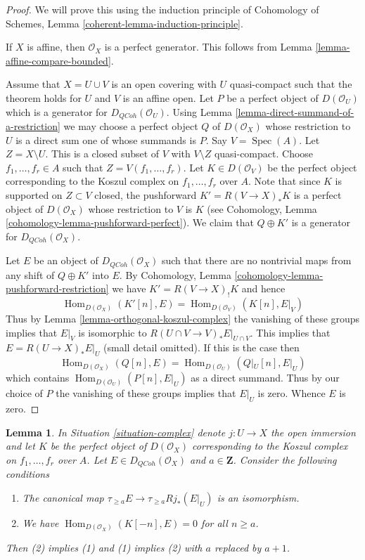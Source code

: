 \documentclass{amsart}
\theoremstyle{plain}
\newtheorem{lemma}[subsection]{Lemma}
\theoremstyle{definition}
\theoremstyle{remark}
\numberwithin{equation}{subsection}
\def\Spec{\mathop{\mathrm{Spec}}}
\def\Hom{\mathop{\mathrm{Hom}}\nolimits}
\def\QCoh{\mathit{QCoh}}
\begin{document}
\begin{proof}
We will prove this using the induction principle of
Cohomology of Schemes, Lemma \ref{coherent-lemma-induction-principle}.

\medskip\noindent
If $X$ is affine, then $\mathcal{O}_X$ is a perfect generator.
This follows from Lemma \ref{lemma-affine-compare-bounded}.

\medskip\noindent
Assume that $X = U \cup V$ is an open covering with $U$ quasi-compact
such that the theorem holds for $U$ and $V$ is an affine open.
Let $P$ be a perfect object of $D(\mathcal{O}_U)$ which is a generator
for $D_\QCoh(\mathcal{O}_U)$. Using
Lemma \ref{lemma-direct-summand-of-a-restriction} we may
choose a perfect object
$Q$ of $D(\mathcal{O}_X)$ whose restriction to $U$ is a direct sum one
of whose summands is $P$. Say $V = \Spec(A)$. Let $Z = X \setminus U$.
This is a closed subset of $V$ with $V \setminus Z$ quasi-compact.
Choose $f_1, \ldots, f_r \in A$ such that
$Z = V(f_1, \ldots, f_r)$. Let $K \in D(\mathcal{O}_V)$ be the perfect
object corresponding to the Koszul complex on $f_1, \ldots, f_r$ over $A$.
Note that since $K$ is supported on $Z \subset V$ closed, the pushforward
$K' = R(V \to X)_*K$ is a perfect object of $D(\mathcal{O}_X)$ whose
restriction to $V$ is $K$ (see
Cohomology, Lemma \ref{cohomology-lemma-pushforward-perfect}).
We claim that $Q \oplus K'$ is a generator for
$D_\QCoh(\mathcal{O}_X)$.

\medskip\noindent
Let $E$ be an object of $D_\QCoh(\mathcal{O}_X)$ such that
there are no nontrivial maps from any shift of $Q \oplus K'$ into $E$.
By Cohomology, Lemma \ref{cohomology-lemma-pushforward-restriction}
we have $K' =  R(V \to X)_! K$ and hence
$$
\Hom_{D(\mathcal{O}_X)}(K'[n], E) = \Hom_{D(\mathcal{O}_V)}(K[n], E|_V)
$$
Thus by Lemma \ref{lemma-orthogonal-koszul-complex} the vanishing of
these groups implies that $E|_V$ is isomorphic to
$R(U \cap V \to V)_*E|_{U \cap V}$. This implies that $E = R(U \to X)_*E|_U$
(small detail omitted). If this is the case then
$$
\Hom_{D(\mathcal{O}_X)}(Q[n], E) = \Hom_{D(\mathcal{O}_U)}(Q|_U[n], E|_U)
$$
which contains $\Hom_{D(\mathcal{O}_U)}(P[n], E|_U)$ as a direct summand.
Thus by our choice of $P$ the vanishing of these groups implies that $E|_U$
is zero. Whence $E$ is zero.
\end{proof}


\begin{lemma}
\label{lemma-orthogonal-koszul-first-variant}
In Situation \ref{situation-complex} denote $j : U \to X$ the open
immersion and let $K$ be the perfect object of $D(\mathcal{O}_X)$
corresponding to the Koszul complex on $f_1, \ldots, f_r$ over $A$.
Let $E \in D_\QCoh(\mathcal{O}_X)$ and $a \in \mathbf{Z}$.
Consider the following conditions
\begin{enumerate}
\item The canonical map $\tau_{\geq a}E \to \tau_{\geq a} Rj_*(E|_U)$
is an isomorphism.
\item We have $\Hom_{D(\mathcal{O}_X)}(K[-n], E) = 0$ for all $n \geq a$.
\end{enumerate}
Then (2) implies (1) and (1) implies (2) with $a$ replaced by $a + 1$.
\end{lemma}
\end{document}
